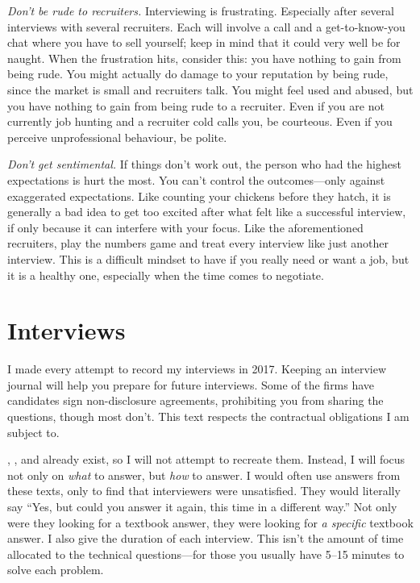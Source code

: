 \documentclass[a4paper]{article}
\begin{document}
\emph{Don't be rude to recruiters.}
Interviewing is frustrating. Especially after several interviews with several recruiters.
Each will involve a call and a get-to-know-you chat where you have to sell yourself; keep in mind that it could very well be for naught.
When the frustration hits, consider this:
you have nothing to gain from being rude.
You might actually do damage to your reputation by being rude, since the market is small and recruiters talk.
You might feel used and abused, but
you have nothing to gain from being rude to a recruiter.
Even if you are not currently job hunting and a recruiter cold calls you, be courteous.
Even if you perceive unprofessional behaviour, be polite.

\emph{Don't get sentimental.}
If things don't work out, the person who had the highest expectations is hurt the most.
You can't control the outcomes---only against exaggerated expectations.
Like counting your chickens before they hatch, it is generally a bad idea to get too excited after  what felt like a successful interview, if only because it can interfere with your focus.
Like the aforementioned recruiters, play the numbers game and treat every interview like just another interview.
This is a difficult mindset to have if you really need or want a job, but it is a healthy one, especially when the time comes to negotiate.


\section{Interviews}

I made every attempt to record my interviews in 2017.
Keeping an interview journal will help you prepare for future interviews.
Some of the firms have candidates sign non-disclosure agreements, prohibiting you from sharing the questions, though most don't.
This text respects the contractual obligations I am subject to.

\citet{HeardOnTheStreet},
\citet{JoshiQA}, and
\citet{WilmottFAQ} already exist, so I will not attempt to recreate them.
Instead, I will focus not only on \emph{what} to answer, but \emph{how} to answer.
I would often use answers from these texts, only to find that interviewers were unsatisfied.
They would literally say ``Yes, but could you answer it again, this time in a different way.''
Not only were they looking for a textbook answer, they were looking for \emph{a specific} textbook answer.
I also give the duration of each interview.
This isn't the amount of time allocated to the technical questions---for those you usually have  5--15 minutes to solve each problem.
\end{document}
